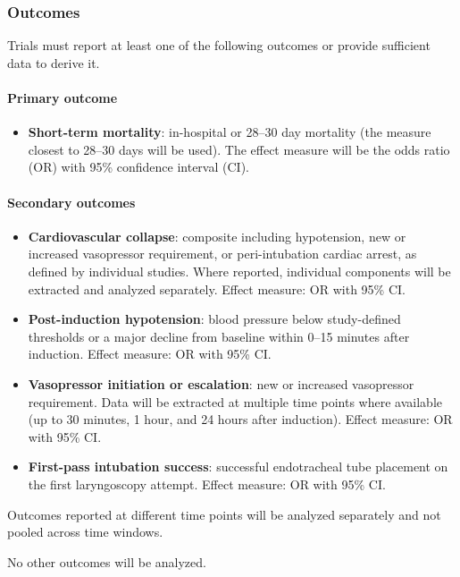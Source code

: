 \documentclass[11pt]{article}
\begin{document}
\subsubsection{Outcomes}

Trials must report at least one of the following outcomes or provide sufficient data to derive it.

\paragraph{Primary outcome}

\begin{itemize}
  \item \textbf{Short-term mortality}: in-hospital or 28--30 day mortality (the measure closest to 28--30 days will be used). The effect measure will be the odds ratio (OR) with 95\% confidence interval (CI).
\end{itemize}

\paragraph{Secondary outcomes}

\begin{itemize}
  \item \textbf{Cardiovascular collapse}: composite including hypotension, new or increased vasopressor requirement, or peri-intubation cardiac arrest, as defined by individual studies. Where reported, individual components will be extracted and analyzed separately. Effect measure: OR with 95\% CI.
  \item \textbf{Post-induction hypotension}: blood pressure below study-defined thresholds or a major decline from baseline within 0--15 minutes after induction. Effect measure: OR with 95\% CI.
  \item \textbf{Vasopressor initiation or escalation}: new or increased vasopressor requirement. Data will be extracted at multiple time points where available (up to 30 minutes, 1 hour, and 24 hours after induction). Effect measure: OR with 95\% CI.
  \item \textbf{First-pass intubation success}: successful endotracheal tube placement on the first laryngoscopy attempt. Effect measure: OR with 95\% CI.
\end{itemize}

Outcomes reported at different time points will be analyzed separately and not pooled across time windows.

No other outcomes will be analyzed.
\end{document}
